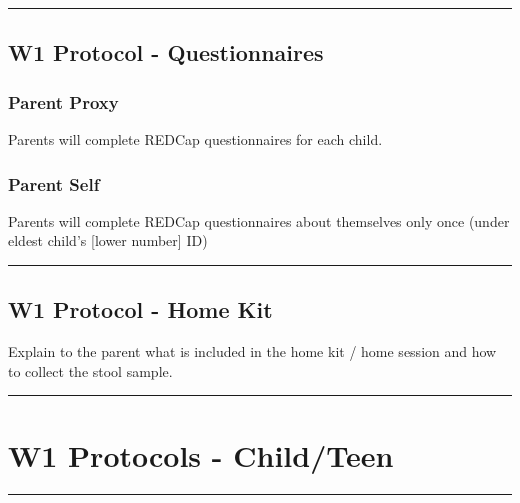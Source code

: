 \documentclass[
]{book}
\begin{document}
\begin{center}\rule{0.5\linewidth}{0.5pt}\end{center}

\hypertarget{w1-protocol---questionnaires}{%
\subsection{W1 Protocol - Questionnaires}\label{w1-protocol---questionnaires}}

\hypertarget{parent-proxy-1}{%
\subsubsection{Parent Proxy}\label{parent-proxy-1}}

Parents will complete REDCap questionnaires for each child.

\hypertarget{parent-self-1}{%
\subsubsection{Parent Self}\label{parent-self-1}}

Parents will complete REDCap questionnaires about themselves only once (under eldest child's {[}lower number{]} ID)

\begin{center}\rule{0.5\linewidth}{0.5pt}\end{center}

\hypertarget{w1-protocol---home-kit}{%
\subsection{W1 Protocol - Home Kit}\label{w1-protocol---home-kit}}

Explain to the parent what is included in the home kit / home session and how to collect the stool sample.

\begin{center}\rule{0.5\linewidth}{0.5pt}\end{center}

\hypertarget{w1-protocols---childteen}{%
\section{W1 Protocols - Child/Teen}\label{w1-protocols---childteen}}

\begin{center}\rule{0.5\linewidth}{0.5pt}\end{center}
\end{document}
